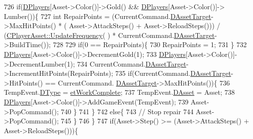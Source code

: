 \begin{DoxyCode}
726                         \textcolor{keywordflow}{if}(\hyperlink{classCGameModel_a524436c3560b10e1c6d6fdd0b66565dc}{DPlayers}[Asset->Color()]->Gold() && \hyperlink{classCGameModel_a524436c3560b10e1c6d6fdd0b66565dc}{DPlayers}[Asset->Color()]->
      Lumber())\{
727                             \textcolor{keywordtype}{int} RepairPoints = (CurrentCommand.\hyperlink{structSAssetCommand_a3d9b43f6e59c386c48c41a65448a0c39}{DAssetTarget}->MaxHitPoints() * (
      Asset->AttackSteps() + Asset->ReloadSteps())) / (\hyperlink{classCPlayerAsset_a0aff85b9552967a42f4f3f42cb59c19f}{CPlayerAsset::UpdateFrequency}(
      ) * CurrentCommand.\hyperlink{structSAssetCommand_a3d9b43f6e59c386c48c41a65448a0c39}{DAssetTarget}->BuildTime());
728                             
729                             \textcolor{keywordflow}{if}(0 == RepairPoints)\{
730                                 RepairPoints = 1;   
731                             \}
732                             \hyperlink{classCGameModel_a524436c3560b10e1c6d6fdd0b66565dc}{DPlayers}[Asset->Color()]->DecrementGold(1);
733                             \hyperlink{classCGameModel_a524436c3560b10e1c6d6fdd0b66565dc}{DPlayers}[Asset->Color()]->DecrementLumber(1);
734                             CurrentCommand.\hyperlink{structSAssetCommand_a3d9b43f6e59c386c48c41a65448a0c39}{DAssetTarget}->IncrementHitPoints(RepairPoints);
735                             \textcolor{keywordflow}{if}(CurrentCommand.\hyperlink{structSAssetCommand_a3d9b43f6e59c386c48c41a65448a0c39}{DAssetTarget}->HitPoints() == CurrentCommand.
      \hyperlink{structSAssetCommand_a3d9b43f6e59c386c48c41a65448a0c39}{DAssetTarget}->MaxHitPoints())\{
736                                 TempEvent.\hyperlink{structSGameEvent_afa10562e243f4ac2b473b655cc58fee7}{DType} = \hyperlink{GameModel_8h_abfcf510bafec7c6429906a6ecaac656da0106cf4227412990140c1d773244b587}{etWorkComplete};
737                                 TempEvent.\hyperlink{structSGameEvent_a40c85eeac83b96887b7449c9bdc5d624}{DAsset} = Asset;
738                                 \hyperlink{classCGameModel_a524436c3560b10e1c6d6fdd0b66565dc}{DPlayers}[Asset->Color()]->AddGameEvent(TempEvent);
739                                 Asset->PopCommand();
740                             \}
741                         \}
742                         \textcolor{keywordflow}{else}\{
743                             \textcolor{comment}{// Stop repair}
744                             Asset->PopCommand();   
745                         \}
746                     \}
747                     \textcolor{keywordflow}{if}(Asset->Step() >= (Asset->AttackSteps() + Asset->ReloadSteps()))\{

\end{DoxyCode}
